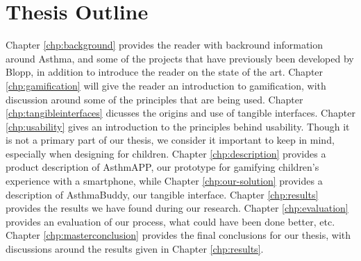 \section{Thesis Outline}
Chapter \ref{chp:background} provides the reader with backround information around Asthma, and some of the projects that have previously been developed by Blopp, in addition to introduce the reader on the state of the art. 
Chapter \ref{chp:gamification} will give the reader an introduction to gamification, with discussion around some of the principles that are being used. 
Chapter \ref{chp:tangibleinterfaces} dicusses the origins and use of tangible interfaces.
Chapter \ref{chp:usability} gives an introduction to the principles behind usability. Though it is not a primary part of our thesis, we consider it important to keep in mind, especially when designing for children.
Chapter \ref{chp:description} provides a product description of AsthmAPP, our prototype for gamifying children's experience with a smartphone, while Chapter \ref{chp:our-solution} provides a description of AsthmaBuddy, our tangible interface.
Chapter \ref{chp:results} provides the results we have found during our research.
Chapter \ref{chp:evaluation} provides an evaluation of our process, what could have been done better, etc. 
Chapter \ref{chp:masterconclusion} provides the final conclusions for our thesis, with discussions around the results given in Chapter \ref{chp:results}.          